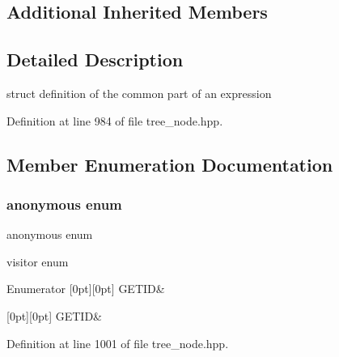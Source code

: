 \subsection*{Additional Inherited Members}


\subsection{Detailed Description}
struct definition of the common part of an expression 

Definition at line 984 of file tree\+\_\+node.\+hpp.



\subsection{Member Enumeration Documentation}
\mbox{\label{structexpr__node_a7329dd4bd79d039282d90459c9993bcd}} 
\subsubsection{\texorpdfstring{anonymous enum}{anonymous enum}}
{\footnotesize\ttfamily anonymous enum}



visitor enum 

\begin{DoxyEnumFields}{Enumerator}
[0pt][0pt]{}\mbox{\label{structexpr__node_a7329dd4bd79d039282d90459c9993bcda7385ad18fe6eda5651301c4ce1de7f30}} 
G\+E\+T\+ID&\\
\hline

[0pt][0pt]{}\mbox{\label{structexpr__node_a7329dd4bd79d039282d90459c9993bcda7385ad18fe6eda5651301c4ce1de7f30}} 
G\+E\+T\+ID&\\
\hline

\end{DoxyEnumFields}


Definition at line 1001 of file tree\+\_\+node.\+hpp.



